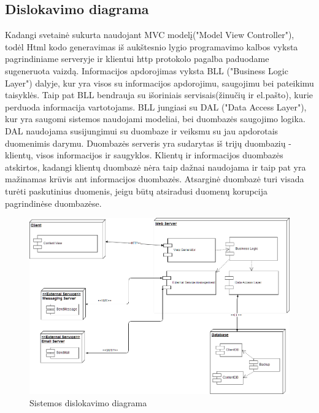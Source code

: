 \documentclass{VUMIFPSkursinis}
\begin{document}
		\subsection{Dislokavimo diagrama}
		Kadangi svetainė sukurta naudojant MVC modelį("Model View Controller"), todėl Html kodo generavimas iš aukštesnio lygio programavimo kalbos vyksta pagrindiniame serveryje ir klientui http protokolo pagalba paduodame sugeneruota vaizdą. Informacijos apdorojimas vyksta BLL ("Business Logic Layer") dalyje, kur yra visos su informacijos apdorojimu, saugojimu bei pateikimu taisyklės. Taip pat BLL bendrauja su išoriniais servisais(žinučių ir el.pašto), kurie perduoda informacija vartotojams. BLL jungiasi su DAL ("Data Access Layer"), kur yra saugomi sistemos naudojami modeliai, bei duombazės saugojimo logika. DAL naudojama susijungimui su duombaze ir veiksmu su jau apdorotais duomenimis darymu. Duombazės serveris yra sudarytas iš trijų duombazių - klientų, visos informacijos ir saugyklos. Klientų ir informacijos duombazės atskirtos, kadangi klientų duombazė nėra taip dažnai naudojama ir taip pat yra mažinamas krūvis ant informacijos duombazės. Atsarginė duombazė turi visada turėti paskutinius duomenis, jeigu būtų atsiradusi duomenų korupcija pagrindinėse duombazėse.
		\begin{figure}[H]
			\centering
			\includegraphics[width=\textwidth]{img/PSI5/DeployementDiagram.png}
			\caption{Sistemos dislokavimo diagrama}
			\label{fig:dislokavimo}
		\end{figure}
		
\end{document}
